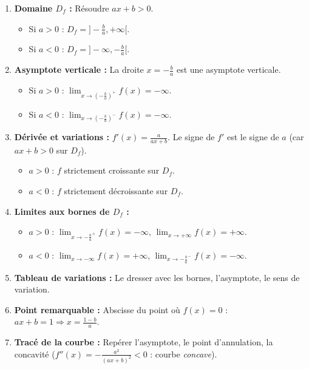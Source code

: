\documentclass[11pt]{article}
\begin{document}
\begin{methode}[Étude systématique de $f(x)=\ln(ax+b)$ ($a\neq 0$)]
\begin{enumerate}
  \item \textbf{Domaine $D_f$ :} Résoudre $ax+b > 0$.
        \begin{itemize}
          \item Si $a>0$ : $D_f = ]-\frac{b}{a}, +\infty[$.
          \item Si $a<0$ : $D_f = ]-\infty, -\frac{b}{a}[$.
        \end{itemize}
  \item \textbf{Asymptote verticale :} La droite $x = -\frac{b}{a}$ est une asymptote verticale.
        \begin{itemize}
          \item Si $a>0$ : $\lim_{x\to (-\frac{b}{a})^+} f(x) = -\infty$.
          \item Si $a<0$ : $\lim_{x\to (-\frac{b}{a})^-} f(x) = -\infty$.
        \end{itemize}
  \item \textbf{Dérivée et variations :} $f'(x) = \frac{a}{ax+b}$.
        Le signe de $f'$ est le signe de $a$ (car $ax+b>0$ sur $D_f$).
        \begin{itemize}
          \item $a>0$ : $f$ strictement croissante sur $D_f$.
          \item $a<0$ : $f$ strictement décroissante sur $D_f$.
        \end{itemize}
  \item \textbf{Limites aux bornes de $D_f$ :}
        \begin{itemize}
          \item $a>0$ : $\lim_{x\to -\frac{b}{a}^+} f(x)=-\infty$, $\lim_{x\to +\infty} f(x)=+\infty$.
          \item $a<0$ : $\lim_{x\to -\infty} f(x)=+\infty$, $\lim_{x\to -\frac{b}{a}^-} f(x)=-\infty$.
        \end{itemize}
  \item \textbf{Tableau de variations :} Le dresser avec les bornes, l'asymptote, le sens de variation.
  \item \textbf{Point remarquable :} Abscisse du point où $f(x)=0$ : $ax+b=1 \Rightarrow x=\frac{1-b}{a}$.
  \item \textbf{Tracé de la courbe :} Repérer l'asymptote, le point d'annulation, la concavité ($f''(x)=-\frac{a^2}{(ax+b)^2}<0$ : courbe \emph{concave}).
\end{enumerate}
\end{methode}
\end{document}
